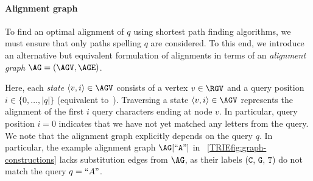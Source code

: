 %
%

\paragraph{Alignment graph}
To find an optimal alignment of $q$ using shortest path finding algorithms, we
must ensure that only paths spelling $q$ are considered. To this end, we
introduce an alternative but equivalent formulation of alignments in terms of an
\emph{alignment graph} $\AG=(\AGV,\AGE)$.

Here, each \emph{state} $\langle v,i \rangle \in \AGV$ consists of a vertex $v \in
\RGV$ and a query position $i \in \{0,\dots,|q|\}$ (equivalent
to~\cite{rautiainen_aligning_2017}). Traversing a state $\langle v,i \rangle \in
\AGV$ represents the alignment of the first $i$ query characters ending at node $v$.
%
In particular, query position $i=0$ indicates that we have not yet matched any
letters from the query.
%
We note that the alignment graph explicitly depends on the query $q$. In
particular, the example alignment graph $\AG[``\texttt{A}"]$ in
~\cref{TRIEfig:graph-constructions} lacks substitution edges from $\AG$, as their
labels ($\texttt{C}$, $\texttt{G}$, $\texttt{T}$) do not match the query
$q=``A"$.

